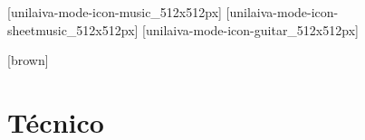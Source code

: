 
\newcommand{\subbooktitle}{Alfredo}


\renewcommand{\bookbytext}{%
  Recebido por:\par\vspace{0.618034ex}\textbf{\Large Padrinho Alfredo}%
}%




              [unilaiva-mode-icon-music_512x512px]%
              [unilaiva-mode-icon-sheetmusic_512x512px]%
              [unilaiva-mode-icon-guitar_512x512px]
  \imprintpage

  \toc

  \setcounter{chapter}{0}

  [brown]
    \begin{songs}{}
      
    \end{songs}

  \appendix

  \ifchorded
    \chapter{Técnico}
      
  \fi


